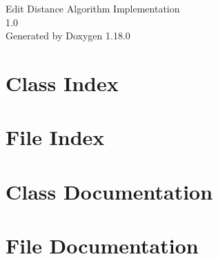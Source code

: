 \documentclass[twoside]{book}
\newcommand{\+}{\discretionary{\mbox{\scriptsize$\hookleftarrow$}}{}{}}
\newcommand{\clearemptydoublepage}{%
    \newpage{\pagestyle{empty}\cleardoublepage}%
  }
\begin{document}
  \raggedbottom
    \hypersetup{pageanchor=false,
                bookmarksnumbered=true,
                pdfencoding=unicode
               }
  \begin{titlepage}
  \vspace*{7cm}
  \begin{center}%
  {\Large Edit Distance Algorithm Implementation}\\
  [1ex]\large 1.\+0 \\
  \vspace*{1cm}
  {\large Generated by Doxygen 1.18.0}\\
  \end{center}
  \end{titlepage}
  \clearemptydoublepage
  \tableofcontents
  \clearemptydoublepage
  \hypersetup{pageanchor=true}
\chapter{Class Index}

\chapter{File Index}

\chapter{Class Documentation}


\chapter{File Documentation}










  \backmatter
  \newpage
  \clearemptydoublepage
  \printindex
\end{document}
